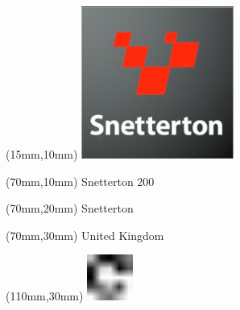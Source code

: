 \null\newpage
\begin{textblock*}{50mm}(15mm,10mm)%
\includegraphics[width=50mm]{LG/2015-05-20_00095.png}
\end{textblock*}
\begin{textblock*}{130mm}(70mm,10mm)%
{\fontsize{20}{20}\selectfont Snetterton 200}\\
\end{textblock*}
\begin{textblock*}{120mm}(70mm,20mm)%
{\fontsize{16}{16}\selectfont Snetterton}\\
\end{textblock*}
\begin{textblock*}{120mm}(70mm,30mm)%
{\fontsize{12}{12}\selectfont United Kingdom}
\end{textblock*}
\begin{textblock*}{30mm}(110mm,30mm)%
\centering
\includegraphics[height=15mm]{icons/fa-rotate-right.pdf}
\end{textblock*}

